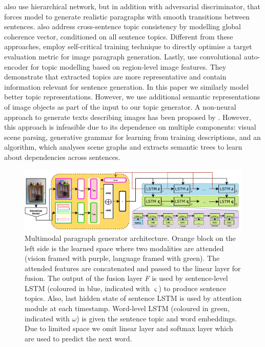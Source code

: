 \documentclass[11pt,a4paper]{article}
\begin{document}

 also use hierarchical network, but in addition with adversarial discriminator, that forces model to generate realistic paragraphs with smooth transitions between sentences.
 also address cross-sentence topic consistency by modelling global coherence vector, conditioned on all sentence topics.
Different from these approaches,  employ self-critical training technique \cite{selfcritical2016} to directly optimise a target evaluation metric for image paragraph generation.
Lastly,  use convolutional auto-encoder for topic modelling based on region-level image features.
They demonstrate that extracted topics are more representative and contain information relevant for sentence generation.
In this paper we similarly model better topic representations.
However, we use additional semantic representations of image objects as part of the input to our topic generator.
A non-neural approach to generate texts describing images has been proposed by .
However, this approach is infeasible due to its dependence on multiple components: visual scene parsing, generative grammar for learning from training descriptions, and an algorithm, which analyses scene graphs and extracts semantic trees to learn about dependencies across sentences.

\begin{figure}[h!]
  \includegraphics[width=\linewidth]{figures/model}
  \caption{Multimodal paragraph generator architecture.
  		Orange block on the left side is the learned space where two modalities are attended (vision framed with purple, language framed with green).
		The attended features are concatenated and passed to the linear layer for fusion.
		The output of the fusion layer \textit{F} is used by sentence-level LSTM (coloured in blue, indicated with $\varsigma$) to produce sentence topics.
		Also, last hidden state of sentence LSTM is used by attention module at each timestamp.
		Word-level LSTM (coloured in green, indicated with $\omega$) is given the sentence topic and word embeddings.
		Due to limited space we omit linear layer and softmax layer which are used to predict the next word.}
  \label{fig:model}
\end{figure}
\end{document}
